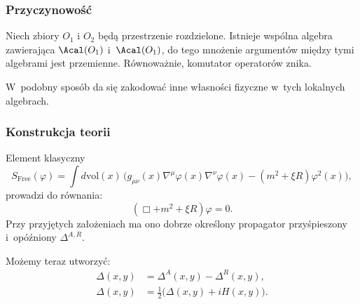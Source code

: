 \documentclass[10pt,t]{beamer}
\begin{document}
\begin{frame}
  \frametitle{Przyczynowość}


  Niech zbiory $O_{ 1 }$ i $O_{ 2 }$ będą przestrzenie rozdzielone.
  Istnieje wspólna algebra zawierająca $\Acal( O_{ 1 } )$
  i~$\Acal( O_{ 1 } )$, do tego mnożenie argumentów między tymi
  algebrami jest przemienne. Równoważnie, komutator operatorów znika.

  W~podobny sposób da się zakodować inne własności fizyczne w~tych
  lokalnych algebrach.

\end{frame}





\begin{frame}
  \frametitle{Konstrukcja teorii}


  Element klasyczny
  \begin{equation}
    \label{eq:Niespodziewane-teoretyczne-14}
    S_{ \mathrm{Free} }( \varphi ) =
    \int d \mathrm{vol}( x )\, \big( g_{ \mu \nu }( x ) \nabla^{ \mu } \varphi( x )
    \nabla^{ \nu } \varphi( x ) - ( m^{ 2 } + \xi R ) \varphi^{ 2 }( x ) \big),
  \end{equation}
  prowadzi do równania:
  \begin{equation}
    \label{eq:Niespodziewane-teoretyczne-15}
    ( \Box  + m^{ 2 } + \xi R ) \varphi = 0.
  \end{equation}
  Przy przyjętych założeniach ma ono dobrze określony propagator
  przyśpieszony i~opóźniony $\Delta^{ A, R }$.

  Możemy teraz utworzyć:
  \begin{subequations}
    \begin{align}
      \label{eq:Niespodziewane-teoretyczne-16-A}
      \Delta( x, y )
      &= \Delta^{ A }( x, y ) - \Delta^{ R }( x, y ), \\
      \label{eq:Niespodziewane-teoretyczne-16-B}
      \Delta( x, y )
      &= \frac{ 1 }{ 2 } \big( \Delta( x, y ) + i H( x, y ) \big).
    \end{align}
  \end{subequations}

\end{frame}
\end{document}
